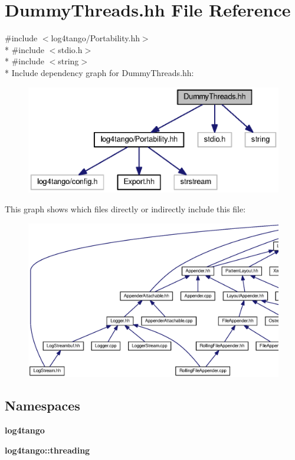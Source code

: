 \section{Dummy\-Threads.\-hh File Reference}
\label{DummyThreads_8hh}
{\ttfamily \#include $<$log4tango/\-Portability.\-hh$>$}\\*
{\ttfamily \#include $<$stdio.\-h$>$}\\*
{\ttfamily \#include $<$string$>$}\\*
Include dependency graph for Dummy\-Threads.\-hh\-:
\nopagebreak
\begin{figure}[H]
\begin{center}
\leavevmode
\includegraphics[width=350pt]{da/dbc/DummyThreads_8hh__incl}
\end{center}
\end{figure}
This graph shows which files directly or indirectly include this file\-:
\nopagebreak
\begin{figure}[H]
\begin{center}
\leavevmode
\includegraphics[width=350pt]{d5/da5/DummyThreads_8hh__dep__incl}
\end{center}
\end{figure}
\subsection*{Namespaces}
\begin{DoxyCompactItemize}
\item 
{\bf log4tango}
\item 
{\bf log4tango\-::threading}
\end{DoxyCompactItemize}
